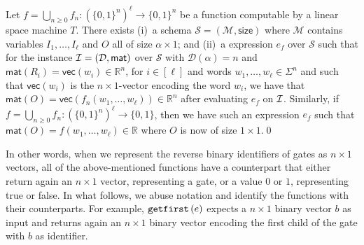 \begin{proposition} \label{prop:transducer2}
Let $f=\bigcup_{n\geq 0}f_n:(\{0,1\}^n)^\ell\to \{0,1\}^n$ be a function computable by a linear space machine
$T$.
There exists (i)~a \langfor  
schema $\mathcal{S}=(\mathcal{M},\textsf{size})$ where $\mathcal{M}$ contains variables
$I_1,\ldots,I_\ell$ and $O$ all of size $\alpha\times 1$; and (ii)~a \langfor 
expression $e_f$ over $\mathcal{S}$ such that for the instance 
$\mathcal{I}=(\mathcal{D},\textsf{mat})$ over $\mathcal{S}$ with $\mathcal{D}(\alpha)=n$ and 
$\mathsf{mat}(R_i)=\mathsf{vec}(w_i)\in \mathbb{R}^n$,  for $i\in[\ell]$ and words $w_1,\ldots,w_\ell\in\Sigma^n$ and such that $\mathsf{vec}(w_i)$ is the $n\times 1$-vector 
encoding the word $w_i$, we have that  $\mathsf{mat}(O)=\mathsf{vec}(f_n(w_1,\ldots,w_\ell))\in\mathbb{R}^n$ 
after evaluating $e_f$ on $\mathcal{I}$. Similarly, if $f=\bigcup_{n\geq 0}f_n:(\{0,1\}^n)^\ell\to \{0,1\}$, then we have
such an expression $e_f$ such that $\mathsf{mat}(O)=f(w_1,\ldots,w_\ell)\in \mathbb{R}$ where $O$ is now of size $1\times 1$.\qed
\end{proposition}

In other words, when we represent the reverse binary identifiers of gates as $n\times 1$ vectors, all of the above-mentioned functions have a \langfor counterpart that either return again an $n\times 1$ vector, representing a gate, or a value $0$ or $1$, representing true or false. In what follows, we  abuse notation and identify the functions with their \langfor counterparts. For example, $\texttt{getfirst}\left(e \right)$ expects a $n\times 1$ binary vector $b$ as input and returns again an $n\times 1$ binary vector encoding the first child of the gate with $b$ as identifier.

%
%
%


